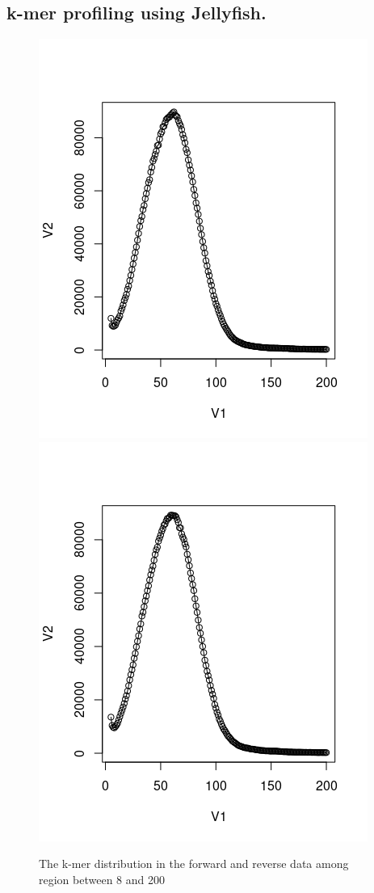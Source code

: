 \documentclass{article}
\begin{document}
\subsection{k-mer profiling using Jellyfish.}
\begin{figure}[h]
	\centering
	\includegraphics[scale=0.5 ]{peak1} 
	\includegraphics[scale=0.5 ]{peak2} \\
	
	\centering \caption{The k-mer distribution in the forward and reverse data among region between 8 and 200}
	\label{saw}
\end{figure}
\end{document}
